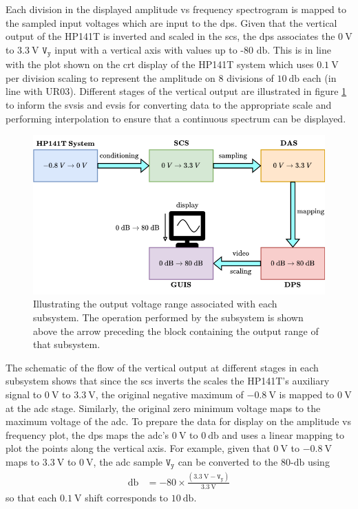 \documentclass[class=report,11pt,crop=false]{standalone}
\begin{document}
	Each division in the displayed amplitude vs frequency spectrogram is mapped to the sampled input voltages which are input to the \acrshort{dps}. Given that the vertical output of the HP141T is inverted and scaled in the \acrshort{scs}, the \acrshort{dps} associates the $\SI{0}{\volt}$ to $\SI{3.3}{\volt}$ $\texttt{V}_\texttt{y}$ input with a vertical axis with values up to -80 $\si{\decibel}$. This is in line with the plot shown on the \acrshort{crt} display of the HP141T system which uses $\SI{0.1}{\volt}$ per division scaling to represent the amplitude on 8 divisions of $\SI{10}{\decibel}$ each (in line with UR03). Different stages of the vertical output are illustrated in figure \ref{fig:dps-vertical-scaling} to inform the \acrshort{svsis} and \acrshort{evsis} for converting data to the appropriate scale and performing interpolation to ensure that a continuous spectrum can be displayed. 
	\begin{figure}[ht!]
		\centering
		\includegraphics[width=0.58\linewidth]{Figures/Methodology/dps-vertical-scaling}
		\caption{Illustrating the output voltage range associated with each subsystem. The operation performed by the subsystem is shown above the arrow preceding the block containing the output range of that subsystem.}
		\label{fig:dps-vertical-scaling}
	\end{figure} 
	The schematic of the flow of the vertical output at different stages in each subsystem shows that since the \acrshort{scs} inverts the scales the HP141T's auxiliary signal to $\SI{0}{\volt}$ to $\SI{3.3}{\volt}$, the original negative maximum of $-\SI{0.8}{\volt}$ is mapped to $\SI{0}{\volt}$ at the \acrshort{adc} stage. Similarly, the original zero minimum voltage maps to the maximum voltage of the \acrshort{adc}. To prepare the data for display on the amplitude vs frequency plot, the \acrshort{dps} maps the \acrshort{adc}'s $\SI{0}{\volt}$ to $\SI{0}{\decibel}$ and uses a linear mapping to plot the points along the vertical axis. For example, given that $\SI{0}{\volt}$ to $-\SI{0.8}{\volt}$ maps to $\SI{3.3}{\volt}$ to $\SI{0}{\volt}$, the \acrshort{adc} sample $\texttt{V}_\texttt{y}$ can be converted to the 80-$\si{\decibel}$ using
	\begin{align}
		\si{\decibel}	& = -80\times \frac{(\SI{3.3}{\volt} - \texttt{V}_\texttt{y})}{\SI{3.3}{\volt}}
	\end{align} 
	so that each $\SI{0.1}{\volt}$ shift corresponds to $\SI{10}{\decibel}$. 
	
\end{document}
